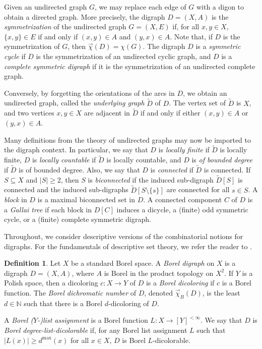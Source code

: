 \documentclass[psamsfonts]{amsart}
\theoremstyle{definition}
\newtheorem{defn}[thm]{Definition}
\newcommand{\N}{\mathbb N}
\theoremstyle{remark}
\numberwithin{equation}{section}
\begin{document}
Given an undirected graph $G$, we may replace each edge of $G$ with a digon to obtain a directed graph. More precisely, the digraph $D = (X, A)$ is the {\it symmetrization} of the undirected graph $G = (X, E)$ if, for all $x, y \in X$, $\{x, y\} \in E$ if and only if $(x, y) \in A$ and $(y, x) \in A$. Note that, if $D$ is the symmetrization of $G$, then $\overrightarrow{\chi}(D) = \chi(G)$. The digraph $D$ is a {\it symmetric cycle} if $D$ is the symmetrization of an undirected cyclic graph, and $D$ is a {\it complete symmetric digraph} if it is the symmetrization of an undirected complete graph.

Conversely, by forgetting the orientations of the arcs in $D$, we obtain an undirected graph, called the {\it underlying graph} $\tilde{D}$ of $D$. The vertex set of $\tilde{D}$ is $X$, and two vertices $x, y \in X$ are adjacent in $\tilde{D}$ if and only if either $(x, y) \in A$ or $(y, x) \in A$.

Many definitions from the theory of undirected graphs may now be imported to the digraph context. In particular, we say that $D$ is {\it locally finite} if $\tilde{D}$ is locally finite, $D$ is {\it locally countable} if $\tilde{D}$ is locally countable, and $D$ is {\it of bounded degree} if $\tilde{D}$ is of bounded degree. Also, we say that $D$ is {\it connected} if $\tilde{D}$ is connected. If $S \subseteq X$ and $\vert S \vert \geq 2$, then $S$ is {\it biconnected} if the induced sub-digraph $\tilde{D}[S]$ is connected and the induced sub-digraphs $\tilde{D} [S \setminus \{s\}]$ are connected for all $s \in S$. A {\it block} in $D$ is a maximal biconnected set in $D$. A connected component $C$ of $D$ is a {\it Gallai tree} if each block in $D[C]$ induces a dicycle, a (finite) odd symmetric cycle, or a (finite) complete symmetric digraph.

Throughout, we consider descriptive versions of the combinatorial notions for digraphs. For the fundamentals of descriptive set theory, we refer the reader to \cite{kechris1995}.

    \begin{defn}
        Let $X$ be a standard Borel space. A \emph{Borel digraph} on $X$ is a digraph $D = (X, A)$, where $A$ is Borel in the product topology on $X^2$. If $Y$ is a Polish space, then a dicoloring $c : X \rightarrow Y$ of $D$ is a \emph{Borel dicoloring} if $c$ is a Borel function. The \emph{Borel dichromatic number} of $D$, denoted $\overrightarrow{\chi}_B(D)$, is the least $d \in \N$ such that there is a Borel $d$-dicoloring of $D$.

        A \emph{Borel ($Y$-)list assignment} is a Borel function $L : X \rightarrow [Y]^{< \infty}$. We say that $D$ is \emph{Borel degree-list-dicolorable} if, for any Borel list assignment $L$ such that $\vert L(x) \vert \geq d^{\max}(x)$ for all $x \in X$, $D$ is Borel $L$-dicolorable.
    \end{defn}
\end{document}
